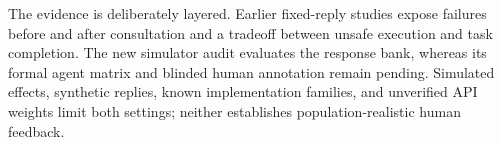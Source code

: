 The evidence is deliberately layered. Earlier fixed-reply studies expose failures before and after consultation and a tradeoff between unsafe execution and task completion. The new simulator audit evaluates the response bank, whereas its formal agent matrix and blinded human annotation remain pending. Simulated effects, synthetic replies, known implementation families, and unverified API weights limit both settings; neither establishes population-realistic human feedback.
